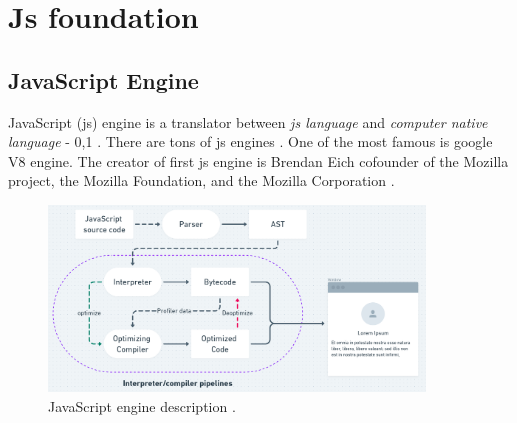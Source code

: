\chapter{Js foundation}

\section{JavaScript Engine}

    JavaScript (\acrshort{js}) engine is a translator between \textit{\acrshort{js} language} and \textit{computer native language} - 0,1  \cite{JavaScriptEngineImage2020}.
    There are tons of \acrshort{js} engines \cite{ECMAScriptEngines}. One of the most famous is google V8 engine. 
    The creator of first \acrshort{js} engine is Brendan Eich cofounder of the Mozilla project, the Mozilla Foundation, and the Mozilla Corporation \cite{BrendanEich}.
    
    \begin{figure}[h]
        \begin{center}
            \includegraphics[width=10cm]{01/images/01-js-engine.png}
            \caption[JavaScript engine]{JavaScript engine description  \cite{JavaScriptEngineImage2020}.}
        \end{center}
    \end{figure}

   
